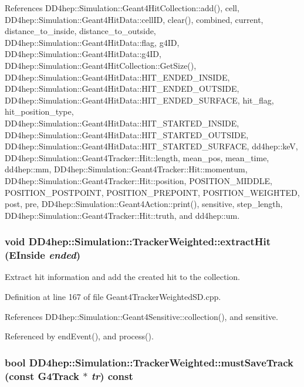 References DD4hep::Simulation::Geant4HitCollection::add(), cell, DD4hep::Simulation::Geant4HitData::cellID, clear(), combined, current, distance\_\-to\_\-inside, distance\_\-to\_\-outside, DD4hep::Simulation::Geant4HitData::flag, g4ID, DD4hep::Simulation::Geant4HitData::g4ID, DD4hep::Simulation::Geant4HitCollection::GetSize(), DD4hep::Simulation::Geant4HitData::HIT\_\-ENDED\_\-INSIDE, DD4hep::Simulation::Geant4HitData::HIT\_\-ENDED\_\-OUTSIDE, DD4hep::Simulation::Geant4HitData::HIT\_\-ENDED\_\-SURFACE, hit\_\-flag, hit\_\-position\_\-type, DD4hep::Simulation::Geant4HitData::HIT\_\-STARTED\_\-INSIDE, DD4hep::Simulation::Geant4HitData::HIT\_\-STARTED\_\-OUTSIDE, DD4hep::Simulation::Geant4HitData::HIT\_\-STARTED\_\-SURFACE, dd4hep::keV, DD4hep::Simulation::Geant4Tracker::Hit::length, mean\_\-pos, mean\_\-time, dd4hep::mm, DD4hep::Simulation::Geant4Tracker::Hit::momentum, DD4hep::Simulation::Geant4Tracker::Hit::position, POSITION\_\-MIDDLE, POSITION\_\-POSTPOINT, POSITION\_\-PREPOINT, POSITION\_\-WEIGHTED, post, pre, DD4hep::Simulation::Geant4Action::print(), sensitive, step\_\-length, DD4hep::Simulation::Geant4Tracker::Hit::truth, and dd4hep::um.\hypertarget{struct_d_d4hep_1_1_simulation_1_1_tracker_weighted_a8299b772daa5da7c49399a40c1de172d}{
\subsubsection[{extractHit}]{\setlength{\rightskip}{0pt plus 5cm}void DD4hep::Simulation::TrackerWeighted::extractHit (EInside {\em ended})}}
\label{struct_d_d4hep_1_1_simulation_1_1_tracker_weighted_a8299b772daa5da7c49399a40c1de172d}


Extract hit information and add the created hit to the collection. 

Definition at line 167 of file Geant4TrackerWeightedSD.cpp.

References DD4hep::Simulation::Geant4Sensitive::collection(), and sensitive.

Referenced by endEvent(), and process().\hypertarget{struct_d_d4hep_1_1_simulation_1_1_tracker_weighted_add13493ece4035deef171e3528c25b56}{
\subsubsection[{mustSaveTrack}]{\setlength{\rightskip}{0pt plus 5cm}bool DD4hep::Simulation::TrackerWeighted::mustSaveTrack (const G4Track $\ast$ {\em tr}) const}}
\label{struct_d_d4hep_1_1_simulation_1_1_tracker_weighted_add13493ece4035deef171e3528c25b56}


